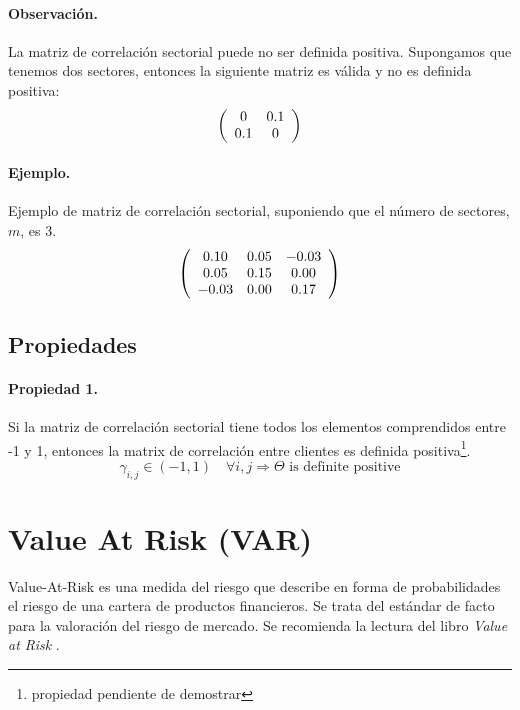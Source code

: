 \paragraph{Observaci\'on.} La matriz de correlaci\'on sectorial puede no ser 
definida positiva. Supongamos que tenemos dos sectores, entonces la siguiente 
matriz es v\'alida y no es definida positiva:
\begin{displaymath}
\left(
\begin{array}{cc}
0 & 0.1 \cr
0.1 & 0
\end{array}
\right)
\end{displaymath}

\paragraph{Ejemplo.} Ejemplo de matriz de correlaci\'on sectorial, suponiendo 
que el n\'umero de sectores, $m$, es 3.
\begin{displaymath}
\left(
\begin{array}{ccc}
 0.10 &  0.05 & -0.03 \cr
 0.05 &  0.15 &  0.00 \cr
-0.03 &  0.00 &  0.17
\end{array}
\right)
\end{displaymath}

\subsection{Propiedades} 

\paragraph{Propiedad 1.} Si la matriz de correlaci\'on sectorial tiene 
todos los elementos comprendidos entre -1 y 1, entonces la matrix de correlaci\'on 
entre clientes es definida positiva\footnote{propiedad pendiente de demostrar}.
\begin{displaymath}
\gamma_{i,j} \in (-1,1) \quad \forall i, j 
\Longrightarrow
\Theta \textrm{ is definite positive}
\end{displaymath}


\section{Value At Risk (VAR)}

Value-At-Risk es una medida del riesgo que describe en forma de probabilidades
el riesgo de una cartera de productos financieros. Se trata del est\'andar de
facto para la valoraci\'on del riesgo de mercado. Se recomienda la lectura del
libro \emph{Value at Risk} \cite{var:jorion}.

